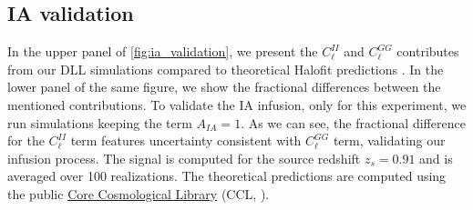 \documentclass{aa}
\begin{document}
\subsection{IA validation}
In the upper panel of  \autoref{fig:ia_validation}, we present the $C_{\ell}^{II}$ and $C_{\ell}^{GG}$ contributes from our DLL simulations compared to theoretical Halofit predictions \citep{smith2003stable}. In the lower panel of the same figure, we show the fractional differences between the mentioned contributions.
To validate the IA infusion, only for this experiment, we run simulations keeping the term $A_{IA}=1$. 
As we can see, the fractional difference for the $C_{\ell}^{II}$ term features uncertainty consistent with $C_{\ell}^{GG}$ term, validating our infusion process. 
The signal is computed for the source redshift $z_s=0.91$ and is averaged over 100 realizations.
 The theoretical predictions are computed using the public \href{https://ccl.readthedocs.io/en/latest/}{Core Cosmological Library} (CCL, \citet{chisari2019core}). 
\end{document}
